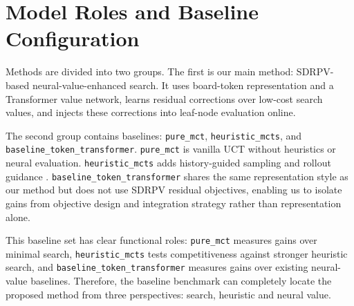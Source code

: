 \section{Model Roles and Baseline Configuration}


Methods are divided into two groups. The first is our main method: SDRPV-based neural-value-enhanced search. It uses board-token representation and a Transformer value network, learns residual corrections over low-cost search values, and injects these corrections into leaf-node evaluation online.


The second group contains baselines: \texttt{pure_mct}, \texttt{heuristic_mcts}, and \texttt{baseline_token_transformer}. \texttt{pure_mct} is vanilla UCT without heuristics or neural evaluation. \texttt{heuristic_mcts} adds history-guided sampling and rollout guidance \cite{finnsson2008simulation}. \texttt{baseline_token_transformer} shares the same representation style as our method but does not use SDRPV residual objectives, enabling us to isolate gains from objective design and integration strategy rather than representation alone.


This baseline set has clear functional roles: \texttt{pure_mct} measures gains over minimal search, \texttt{heuristic_mcts} tests competitiveness against stronger heuristic search, and \texttt{baseline_token_transformer} measures gains over existing neural-value baselines. Therefore, the baseline benchmark can completely locate the proposed method from three perspectives: search, heuristic and neural value.


